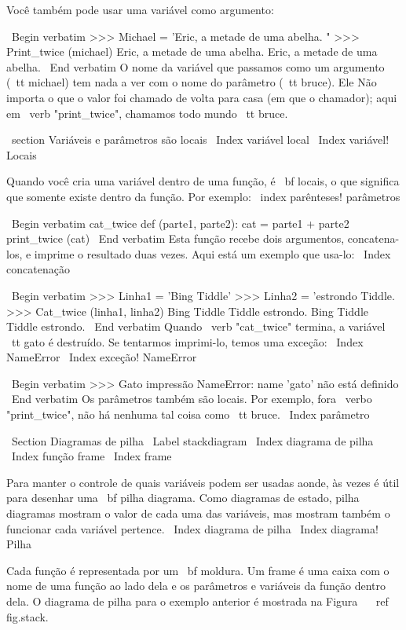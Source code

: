 \documentclass[10pt]{book}
\begin{document}
\begin {itemize}
{Você também pode usar uma variável como argumento:

\ Begin {verbatim}
>>> Michael = 'Eric, a metade de uma abelha. "
>>> Print_twice (michael)
Eric, a metade de uma abelha.
Eric, a metade de uma abelha.
\ End {verbatim}
%
O nome da variável que passamos como um argumento ({\ tt michael}) tem
nada a ver com o nome do parâmetro ({\ tt bruce}). Ele
Não importa o que o valor foi chamado de volta para casa (em que o chamador);
aqui em \ verb "print_twice", chamamos todo mundo {\ tt bruce}.


\ section {Variáveis ​​e parâmetros são locais}
\ Index {variável local}
\ Index {variável! Locais}

Quando você cria uma variável dentro de uma função, é {\ bf locais},
o que significa que somente
existe dentro da função. Por exemplo:
\ index {parênteses! parâmetros}

\ Begin {verbatim}
cat_twice def (parte1, parte2):
    cat = parte1 + parte2
    print_twice (cat)
\ End {verbatim}
%
Esta função recebe dois argumentos, concatena-los, e imprime
o resultado duas vezes. Aqui está um exemplo que usa-lo:
\ Index {concatenação}

\ Begin {verbatim}
>>> Linha1 = 'Bing Tiddle'
>>> Linha2 = 'estrondo Tiddle.
>>> Cat_twice (linha1, linha2)
Bing Tiddle Tiddle estrondo.
Bing Tiddle Tiddle estrondo.
\ End {verbatim}
%
Quando \ verb "cat_twice" termina, a variável {\ tt gato}
é destruído. Se tentarmos imprimi-lo, temos uma exceção:
\ Index {} NameError
\ Index {exceção! NameError}

\ Begin {verbatim}
>>> Gato impressão
NameError: name 'gato' não está definido
\ End {verbatim}
%
Os parâmetros também são locais.
Por exemplo, fora \ verbo "print_twice", não há nenhuma
tal coisa como {\ tt bruce}.
\ Index {parâmetro}


\ Section {Diagramas de pilha}
\ Label {} stackdiagram
\ Index {diagrama de pilha}
\ Index {função frame}
\ Index {frame}

Para manter o controle de quais variáveis ​​podem ser usadas aonde, às vezes é
útil para desenhar uma {\ bf pilha diagrama}. Como diagramas de estado, pilha
diagramas mostram o valor de cada uma das variáveis, mas mostram também o
funcionar cada variável pertence.
\ Index {diagrama de pilha}
\ Index {diagrama! Pilha}

Cada função é representada por um {\ bf moldura}. Um frame é uma caixa
com o nome de uma função
ao lado dela e os parâmetros e variáveis ​​da função dentro dela.
O diagrama de pilha para o
exemplo anterior é mostrada na Figura ~ \ ref {fig.stack}.

}
\end{itemize}
\end{document}

